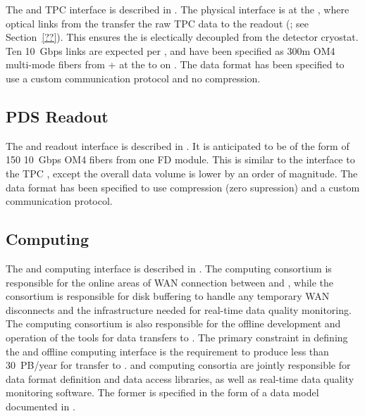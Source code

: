 The  and TPC  interface is described in
. The physical interface is at the , where optical links from the  transfer
the raw TPC data to the   readout (; see
Section~\ref{??}). This ensures the  is electically decoupled from the detector
cryostat. Ten \SI{10}{Gbps} links are expected per , and have
been specified as 300m OM4 multi-mode fibers from + at the  to
 on . The data format has been specified
to use a custom communication protocol and no
compression.

\subsection{PDS Readout}

The  and  readout interface is described in
. It is anticipated to
be of the form of 150  \SI{10}{Gbps} OM4 fibers from one FD module. 
This
is similar to the interface to the TPC , except the overall
data volume is lower by an order of magnitude. The data format has been specified to use
compression (zero supression) and a custom communication protocol.

\subsection{Computing}

The  and computing interface is described in .
 The computing consortium %
 is responsible for the online areas of WAN connection between \surf and
\fnal, while the  consortium is responsible for disk buffering
to handle any temporary WAN disconnects and the infrastructure needed
for real-time data quality monitoring.  The computing consortium 
is also
responsible for the offline development and operation of the tools for data
transfers to \fnal. The primary
constraint in defining the  and offline computing interface is the
requirement to produce less than \SI{30}{PB/year} %
for transfer to
\fnal.  and %
computing consortia are jointly responsible for data
format definition and data access libraries, as well as real-time data
quality monitoring software. The former is specified in the form of a 
data model documented in .

